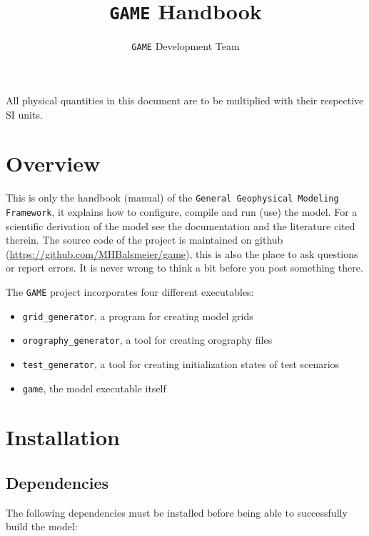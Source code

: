 \documentclass[10pt]{report}
\title{\texttt{GAME} Handbook}
\author{\texttt{GAME} Development Team}
\begin{document}
\maketitle

\vspace*{5 cm}
\begin{center}
All physical quantities in this document are to be multiplied with their respective SI units.
\end{center}

\newpage

\tableofcontents

\chapter{Overview}
\label{chap:overview}

This is only the handbook (manual) of the \texttt{General Geophysical Modeling Framework}, it explains how to configure, compile and run (use) the model. For a scientific derivation of the model see the documentation and the literature cited therein. The source code of the project is maintained on github (\url{https://github.com/MHBalsmeier/game}), this is also the place to ask questions or report errors. It is never wrong to think a bit before you post something there.

The \texttt{GAME} project incorporates four different executables:

\begin{itemize}
\item \texttt{grid\_generator}, a program for creating model grids
\item \texttt{orography\_generator}, a tool for creating orography files
\item \texttt{test\_generator}, a tool for creating initialization states of test scenarios
\item \texttt{game}, the model executable itself
\end{itemize}

\chapter{Installation}
\label{chap:installation}

\section{Dependencies}
\label{sec:dependencies}

The following dependencies must be installed before being able to successfully build the model:
\end{document}
